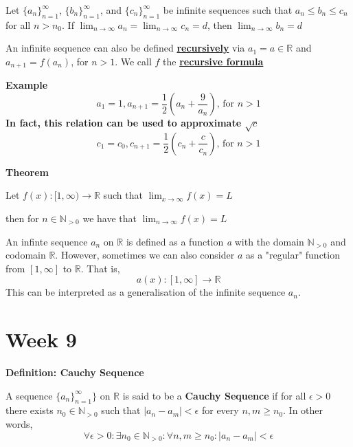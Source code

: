 \documentclass{article}
\newcommand*{\N}{\mathbb{N}}
\newcommand*{\R}{\mathbb{R}}
\begin{document}
Let \(\{a_n\}^{\infty}_{n=1}\), \(\{b_n\}^{\infty}_{n=1}\), and \(\{c_n\}^{\infty}_{n=1}\)  be infinite sequences such that \(a_n \leq b_n \leq c_n\) for all \(n>n_0\). If \(\lim_{n\to\infty}a_n = \lim_{n\to\infty}c_n =d\), then \(\lim_{n\to\infty}b_n=d\)

\vspace{\baselineskip}
An infinite sequence can also be defined \textbf{\underline{recursively}} via \(a_1 = a\in\R\) and \(a_{n+1} = f(a_n)\), for \(n > 1\). We call \(f\) the \textbf{\underline{recursive formula}}

\textbf{Example}
\begin{equation}
    a_1=1, a_{n+1} = \frac{1}{2}\left(a_n + \frac{9}{a_n}\right)\text{, for }n>1
\end{equation}
\textbf{In fact, this relation can be used to approximate \(\sqrt{c}\)}
\begin{equation}
    c_1 = c_0, c_{n+1} = \frac{1}{2}\left(c_n+\frac{c}{c_n}\right)\text{, for }n>1
\end{equation}

\vspace{\baselineskip}
\textbf{Theorem}

Let \(f(x):[1,\infty)\to \R\) such that \(\lim_{x\to\infty}f(x)=L\)

then for \(n \in \N_{>0}\) we have that \(\lim_{n\to\infty}f(x)=L\)

An infinte sequence \(a_n\) on \(\R\) is defined as a function \textit{a} with the domain \(\N_{>0}\) and codomain \(\R\). However, sometimes we can also consider \(a\) as a "regular" function from \([1,\infty]\) to \(\R\). That is,
\begin{equation}
    a(x):[1,\infty]\to\R
\end{equation}
This can be interpreted as a generalisation of the infinite sequence \(a_n\).

\section{Week 9}
\textbf{Definition: Cauchy Sequence}

A sequence \(\{a_n\}^{\infty}_{n=1}\}\) on \(\R\) is said to be a \textbf{Cauchy Sequence} if for all \(\epsilon > 0\) there exists \(n_0 \in \N_{>0}\) such that \(|a_n - a_m| < \epsilon\) for every \(n,m \geq n_0\).
In other words,
\begin{equation}
    \forall \epsilon > 0: \exists n_0 \in \N_{>0}: \forall n,m \geq n_0 : |a_n-a_m|<\epsilon
\end{equation}
\end{document}
